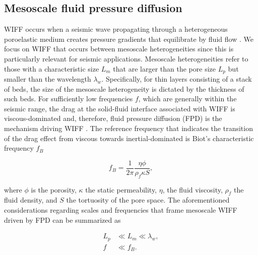 \documentclass[draft]{agujournal2019}
\begin{document}
\subsection{Mesoscale fluid pressure diffusion}
WIFF occurs when a seismic wave propagating through a heterogeneous poroelastic medium creates
pressure gradients that equilibrate by fluid flow \cite{Muller2010}.
We focus on WIFF that occurs between mesoscale heterogeneities since this is particularly relevant for seismic applications. Mesoscale heterogeneities refer to those with a characteristic size $L_m$ that are larger than the pore size $L_p$ but smaller than the wavelength $\lambda_w$. Specifically, for thin layers consisting of a stack of beds, the size of the mesoscale heterogeneity is dictated by the thickness of such beds.
For sufficiently low frequencies $f$, which are generally within the seismic range, the drag at the solid-fluid interface associated with WIFF is viscous-dominated \cite{Johnson1987} and, therefore, fluid pressure diffusion (FPD) is the mechanism driving WIFF \cite{Pride2005}. The reference frequency that indicates the transition of the drag effect from viscous towards inertial-dominated is Biot's characteristic frequency $f_B$ \cite{Biot1956, Dutta1979}
\begin{linenomath*}
\begin{equation}\label{Eq.1}
f_B= \frac{1}{2 \pi} \frac{\eta \phi}{ \rho_f \kappa S },
\end{equation}
\end{linenomath*}
where $\phi$ is the porosity, $\kappa$  the static permeability, $\eta$, the fluid viscosity,  $\rho_f$ the fluid density, and $S$ the tortuosity of the pore space. The aforementioned considerations regarding scales and frequencies that frame mesoscale WIFF driven by FPD can be summarized as
\begin{linenomath*}
\begin{equation}\label{Eq.2}
\begin{split}
 L_p & \ll L_m \ll \lambda_w, \\
f & \ll f_B.
\end{split}
\end{equation}
\end{linenomath*}
\end{document}
